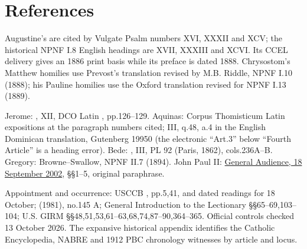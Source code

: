 \section{References}
Augustine's  are cited by Vulgate Psalm numbers XVI, XXXII and XCV; the historical NPNF I.8 English headings are XVII, XXXIII and XCVI. Its CCEL delivery gives an 1886 print basis while its preface is dated 1888. Chrysostom's Matthew homilies use Prevost's translation revised by M.B. Riddle, NPNF I.10 (1888); his Pauline homilies use the Oxford translation revised for NPNF I.13 (1889).

Jerome: , XII, DCO Latin , pp.126--129. Aquinas: Corpus Thomisticum Latin expositions at the paragraph numbers cited;  III, q.48, a.4 in the English Dominican translation, Gutenberg 19950 (the electronic ``Art.3'' below ``Fourth Article'' is a heading error). Bede: , III, PL 92 (Paris, 1862), cols.236A--B. Gregory: Browne--Swallow, NPNF II.7 (1894). John Paul II: \href{https://www.vatican.va/content/john-paul-ii/en/audiences/2002/documents/hf_jp-ii_aud_20020918.html}{General Audience, 18 September 2002}, §§1--5, original paraphrase.

Appointment and occurrence: USCCB , pp.5,41, and dated readings for 18 October;  (1981), no.145 A; General Introduction to the Lectionary §§65--69,103--104; U.S. GIRM §§48,51,53,61--63,68,74,87--90,364--365. Official controls checked 13 October 2026. The expansive historical appendix identifies the Catholic Encyclopedia, NABRE and 1912 PBC chronology witnesses by article and locus.
